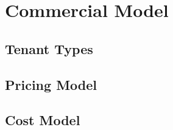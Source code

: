 \section{Commercial Model}
\subsection{Tenant Types}
\subsection{Pricing Model}
\subsection{Cost Model}
